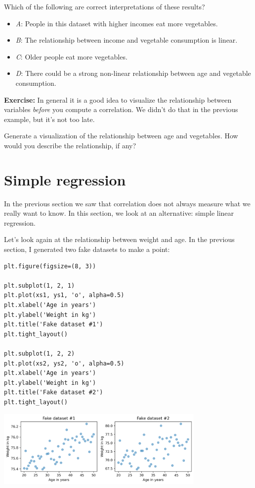 Which of the following are correct interpretations of these results?

\begin{itemize}

\item
  \emph{A}: People in this dataset with higher incomes eat more
  vegetables.
\item
  \emph{B}: The relationship between income and vegetable consumption is
  linear.
\item
  \emph{C}: Older people eat more vegetables.
\item
  \emph{D}: There could be a strong non-linear relationship between age
  and vegetable consumption.
\end{itemize}

\textbf{Exercise:} In general it is a good idea to visualize the
relationship between variables \emph{before} you compute a correlation.
We didn't do that in the previous example, but it's not too late.

Generate a visualization of the relationship between age and vegetables.
How would you describe the relationship, if any?

\hypertarget{simple-regression}{%
\section{Simple regression}\label{simple-regression}}

In the previous section we saw that correlation does not always measure
what we really want to know. In this section, we look at an alternative:
simple linear regression.

Let's look again at the relationship between weight and age. In the
previous section, I generated two fake datasets to make a point:

\begin{lstlisting}[]
plt.figure(figsize=(8, 3))

plt.subplot(1, 2, 1)
plt.plot(xs1, ys1, 'o', alpha=0.5)
plt.xlabel('Age in years')
plt.ylabel('Weight in kg')
plt.title('Fake dataset #1')
plt.tight_layout()

plt.subplot(1, 2, 2)
plt.plot(xs2, ys2, 'o', alpha=0.5)
plt.xlabel('Age in years')
plt.ylabel('Weight in kg')
plt.title('Fake dataset #2')
plt.tight_layout()
\end{lstlisting}

\begin{center}
\includegraphics[width=4in]{chapters/09_relationships_files/09_relationships_78_0.png}
\end{center}

